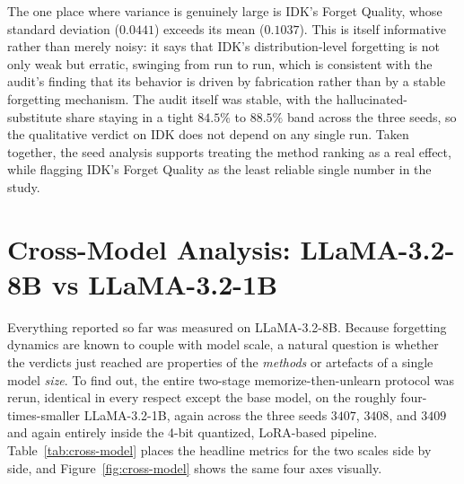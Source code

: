 \documentclass[a4paper,12pt]{report}
\begin{document}
The one place where variance is genuinely large is IDK's Forget Quality, whose standard deviation ($0.0441$) exceeds its mean ($0.1037$). This is itself informative rather than merely noisy: it says that IDK's distribution-level forgetting is not only weak but erratic, swinging from run to run, which is consistent with the audit's finding that its behavior is driven by fabrication rather than by a stable forgetting mechanism. The audit itself was stable, with the hallucinated-substitute share staying in a tight $84.5\%$ to $88.5\%$ band across the three seeds, so the qualitative verdict on IDK does not depend on any single run. Taken together, the seed analysis supports treating the method ranking as a real effect, while flagging IDK's Forget Quality as the least reliable single number in the study.

\section{Cross-Model Analysis: LLaMA-3.2-8B vs LLaMA-3.2-1B}
\label{sec:res-crossmodel}
Everything reported so far was measured on LLaMA-3.2-8B. Because forgetting dynamics are known to couple with model scale, a natural question is whether the verdicts just reached are properties of the \emph{methods} or artefacts of a single model \emph{size}. To find out, the entire two-stage memorize-then-unlearn protocol was rerun, identical in every respect except the base model, on the roughly four-times-smaller LLaMA-3.2-1B, again across the three seeds $3407$, $3408$, and $3409$ and again entirely inside the 4-bit quantized, LoRA-based pipeline. Table~\ref{tab:cross-model} places the headline metrics for the two scales side by side, and Figure~\ref{fig:cross-model} shows the same four axes visually.
\end{document}
